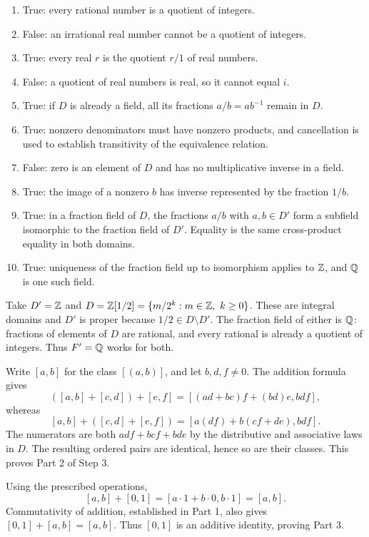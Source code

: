 \begin{enumerate}[label=(\alph*)]
\item True: every rational number is a quotient of integers.
\item False: an irrational real number cannot be a quotient of integers.
\item True: every real $r$ is the quotient $r/1$ of real numbers.
\item False: a quotient of real numbers is real, so it cannot equal $i$.
\item True: if $D$ is already a field, all its fractions $a/b=ab^{-1}$ remain in $D$.
\item True: nonzero denominators must have nonzero products, and cancellation is used to establish transitivity of the equivalence relation.
\item False: zero is an element of $D$ and has no multiplicative inverse in a field.
\item True: the image of a nonzero $b$ has inverse represented by the fraction $1/b$.
\item True: in a fraction field of $D$, the fractions $a/b$ with $a,b\in D'$ form a subfield isomorphic to the fraction field of $D'$. Equality is the same cross-product equality in both domains.
\item True: uniqueness of the fraction field up to isomorphism applies to $\mathbb{Z}$, and $\mathbb{Q}$ is one such field.
\end{enumerate}

Take $D'=\mathbb{Z}$ and $D=\mathbb{Z}[1/2]=\{m/2^k:m\in\mathbb{Z},\ k\ge0\}$. These are integral domains and $D'$ is proper because $1/2\in D\setminus D'$. The fraction field of either is $\mathbb{Q}$: fractions of elements of $D$ are rational, and every rational is already a quotient of integers. Thus $F'=\mathbb{Q}$ works for both.

Write $[a,b]$ for the class $[(a,b)]$, and let $b,d,f\ne0$. The addition formula gives
\[([a,b]+[c,d])+[e,f]=[(ad+bc)f+(bd)e,bdf],
\]
whereas
\[[a,b]+([c,d]+[e,f])=[a(df)+b(cf+de),bdf].
\]
The numerators are both $adf+bcf+bde$ by the distributive and associative laws in $D$. The resulting ordered pairs are identical, hence so are their classes. This proves Part 2 of Step 3.

Using the prescribed operations,
\[[a,b]+[0,1]=[a\cdot1+b\cdot0,b\cdot1]=[a,b].
\]
Commutativity of addition, established in Part 1, also gives $[0,1]+[a,b]=[a,b]$. Thus $[0,1]$ is an additive identity, proving Part 3.

